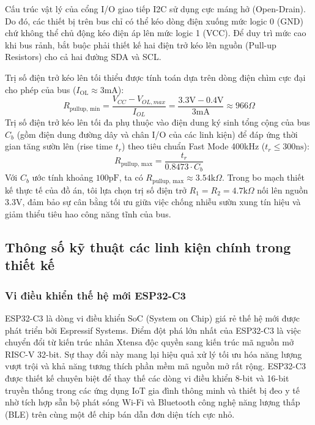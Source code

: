 Cấu trúc vật lý của cổng I/O giao tiếp I2C sử dụng cực máng hở (Open-Drain). Do đó, các thiết bị trên bus chỉ có thể kéo dòng điện xuống mức logic 0 (GND) chứ không thể chủ động kéo điện áp lên mức logic 1 (VCC). Để duy trì mức cao khi bus rảnh, bắt buộc phải thiết kế hai điện trở kéo lên nguồn (Pull-up Resistors) cho cả hai đường SDA và SCL. 

Trị số điện trở kéo lên tối thiểu được tính toán dựa trên dòng điện chìm cực đại cho phép của bus ($I_{\text{OL}} \approx 3\text{mA}$):
\begin{equation}
    R_{\text{pullup, min}} = \frac{V_{CC} - V_{OL, max}}{I_{OL}} = \frac{3.3\text{V} - 0.4\text{V}}{3\text{mA}} \approx 966\Omega
\end{equation}
Trị số điện trở kéo lên tối đa phụ thuộc vào điện dung ký sinh tổng cộng của bus $C_b$ (gồm điện dung đường dây và chân I/O của các linh kiện) để đáp ứng thời gian tăng sườn lên (rise time $t_r$) theo tiêu chuẩn Fast Mode 400kHz ($t_r \le 300\text{ns}$):
\begin{equation}
    R_{\text{pullup, max}} = \frac{t_r}{0.8473 \cdot C_b}
\end{equation}
Với $C_b$ ước tính khoảng $100\text{pF}$, ta có $R_{\text{pullup, max}} \approx 3.54\text{k}\Omega$. Trong bo mạch thiết kế thực tế của đồ án, tôi lựa chọn trị số điện trở $R_1 = R_2 = 4.7\text{k}\Omega$ nối lên nguồn 3.3V, đảm bảo sự cân bằng tối ưu giữa việc chống nhiễu sườn xung tín hiệu và giảm thiểu tiêu hao công năng tĩnh của bus.

\subsection{Thông số kỹ thuật các linh kiện chính trong thiết kế}

\subsubsection{Vi điều khiển thế hệ mới ESP32-C3}
ESP32-C3 là dòng vi điều khiển SoC (System on Chip) giá rẻ thế hệ mới được phát triển bởi Espressif Systems. Điểm đột phá lớn nhất của ESP32-C3 là việc chuyển đổi từ kiến trúc nhân Xtensa độc quyền sang kiến trúc mã nguồn mở RISC-V 32-bit. Sự thay đổi này mang lại hiệu quả xử lý tối ưu hóa năng lượng vượt trội và khả năng tương thích phần mềm mã nguồn mở rất rộng. ESP32-C3 được thiết kế chuyên biệt để thay thế các dòng vi điều khiển 8-bit và 16-bit truyền thống trong các ứng dụng IoT gia đình thông minh và thiết bị đeo y tế nhờ tích hợp sẵn bộ phát sóng Wi-Fi và Bluetooth công nghệ năng lượng thấp (BLE) trên cùng một đế chip bán dẫn đơn diện tích cực nhỏ.

